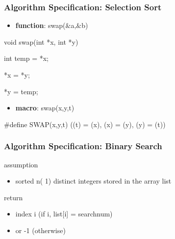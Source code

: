 \documentclass[newPxFont,sthlmFooter,nooffset]{beamer}
\begin{document}
\begin{frame}[t,fragile]
\frametitle{Algorithm Specification: Selection Sort}

\begin{itemize}
\item\textbf{function}: swap($\&$a,$\&$b)
\end{itemize}
\begin{codedef}
void swap(int *x, int *y){
	int temp = *x;
	
	*x = *y;
		
	*y = temp;
}
\end{codedef}
\begin{itemize}
\item\textbf{macro}: swap(x,y,t)
\end{itemize}
\begin{codedef}
#define SWAP(x,y,t) ((t) = (x), (x) = (y), (y) = (t))
\end{codedef}
\end{frame}

\begin{frame}[t]
  \frametitle{Algorithm Specification: Binary Search}
assumption
\begin{itemize}
\item sorted n( 1) distinct integers stored in the array list
\end{itemize}

return 
\begin{itemize}
\item index i (if i, list[i] = searchnum)
\item or -1 (otherwise)
\end{itemize}

\end{frame}
\end{document}
